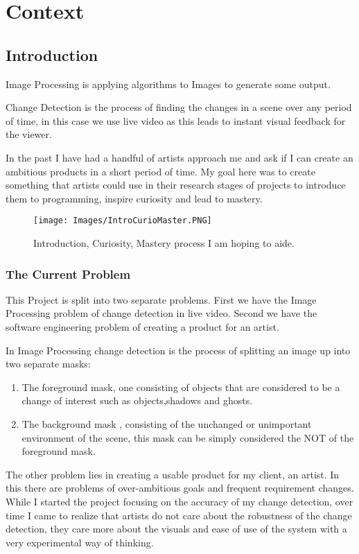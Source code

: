 \documentclass[a4paper]{report}
\begin{document}
\tableofcontents
\clearpage

\chapter{Context}
\section{Introduction}
Image Processing is applying algorithms to Images to generate some output.

Change Detection is the process of finding the changes in a scene over any period of time, in this case we use live video as this leads to instant visual feedback for the viewer.

In the past I have had a handful of artists approach me and ask if I can create an ambitious products in a short period of time. My goal here was to create something that artists could use in their research stages of projects to introduce them to programming, inspire curiosity and lead to mastery.

\begin{figure}
\centering
\texttt{[image: Images/IntroCurioMaster.PNG]}
\caption{\label{fig:Introduction, Curiosity, Mastery process} Introduction, Curiosity, Mastery process I am hoping to aide.}
\end{figure}

\subsection{The Current Problem}
This Project is split into two separate problems. First we have the Image Processing problem of change detection in live video. Second we have the software engineering problem of creating a product for an artist.

In Image Processing change detection is the process of splitting an image up into two separate masks:
\begin{enumerate}
  \item The foreground mask, one consisting of objects that are considered to be a change of interest such as objects,shadows and ghosts.
  \item The background mask , consisting of the unchanged or unimportant environment of the scene, this mask can be simply considered the NOT of the foreground mask.
\end{enumerate}

The other problem lies in creating a usable product for my client, an artist. In this there are problems of over-ambitious goals and frequent requirement changes. While I started the project focusing on the accuracy of my change detection, over time I came to realize that artists do not care about the robustness of the change detection, they care more about the visuals and ease of use of the system with a very experimental way of thinking.
\end{document}
